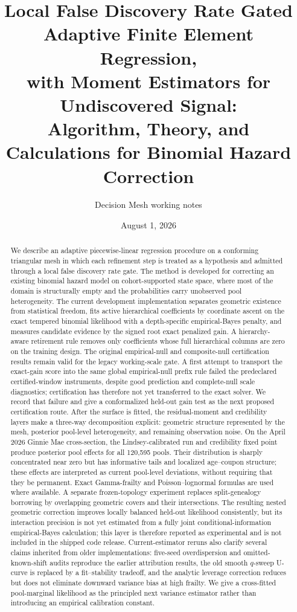 \documentclass[11pt]{article}
\title{Local False Discovery Rate Gated Adaptive Finite Element Regression,\\
with Moment Estimators for Undiscovered Signal:\\
\large Algorithm, Theory, and Calculations for Binomial Hazard Correction}
\author{Decision Mesh working notes}
\date{August 1, 2026}
\begin{document}
\maketitle

\begin{abstract}
We describe an adaptive piecewise-linear regression procedure on a conforming triangular
mesh in which each refinement step is treated as a hypothesis and admitted through a
local false discovery rate gate. The method is developed for correcting an existing
binomial hazard model on cohort-supported state space, where most of the domain is
structurally empty and the probabilities carry unobserved pool heterogeneity. The current
development implementation separates geometric existence from statistical freedom, fits
active hierarchical coefficients by coordinate ascent on the exact tempered binomial
likelihood with a depth-specific empirical-Bayes penalty, and measures candidate evidence
by the signed root exact penalized gain. A hierarchy-aware retirement rule removes only
coefficients whose full hierarchical columns are zero on the training design. The
original empirical-null and composite-null certification results remain valid for the
legacy working-scale gate. A first attempt to transport the exact-gain score into the
same global empirical-null prefix rule failed the predeclared certified-window
instruments, despite good prediction and complete-null scale diagnostics; certification
has therefore not yet transferred to the exact solver. We record that failure and give a
conformalized held-out gain test as the next proposed certification route. After the surface is fitted, the residual-moment and credibility layers make a
three-way decomposition explicit: geometric structure represented by the mesh, posterior
pool-level heterogeneity, and remaining observation noise. On the April 2026 Ginnie Mae
cross-section, the Lindsey-calibrated run and credibility fixed point produce posterior
pool effects for all 120{,}595 pools. Their distribution is sharply concentrated near zero
but has informative tails and localized age--coupon structure; these effects are interpreted
as current pool-level deviations, without requiring that they be permanent. Exact
Gamma-frailty and Poisson--lognormal formulas are used where available. A separate frozen-topology experiment replaces
split-genealogy borrowing by overlapping geometric covers and their intersections. The
resulting nested geometric correction improves locally balanced held-out likelihood
consistently, but its interaction precision is not yet estimated from a fully joint
conditional-information empirical-Bayes calculation; this layer is therefore reported as
experimental and is not included in the shipped code release. Current-estimator reruns also
clarify several claims inherited from older implementations: five-seed overdispersion and
omitted-known-shift audits reproduce the earlier attribution results, the old smooth
$q$-sweep U-curve is replaced by a fit--stability tradeoff, and the analytic leverage
correction reduces but does not eliminate downward variance bias at high frailty. We give a
cross-fitted pool-marginal likelihood as the principled next variance estimator rather than
introducing an empirical calibration constant.
\end{abstract}
\end{document}
